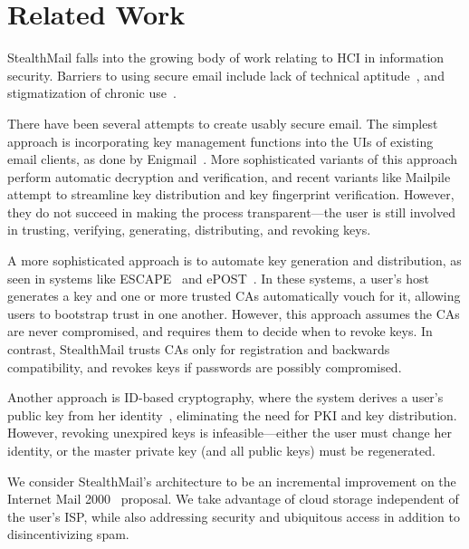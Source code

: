 \section{Related Work}
\label{sec:related-work}

StealthMail falls into the growing body of work relating to HCI in information security.  Barriers
to using secure email include lack of technical aptitude~\cite{garfinkel-email-survey, why-jonny-cant-encrypt}, and
stigmatization of chronic use~\cite{crypto-adoption-criteria}.

There have been several attempts to create usably secure email.
The simplest approach is incorporating key management functions into the 
UIs of existing email clients, as done by Enigmail~\cite{enigmail}.
More sophisticated variants of this approach perform automatic decryption
and verification, and recent variants like Mailpile~\cite{mailpile} attempt
to streamline key distribution and key fingerprint verification.  However, they do not
succeed in making the process transparent---the user is still involved in
trusting, verifying, generating, distributing, and revoking keys.

A more sophisticated approach is to automate key generation and distribution,
as seen in systems like ESCAPE~\cite{escape} and ePOST~\cite{epost}.
In these systems, a user's host generates a key and one or more trusted CAs
automatically vouch for it, allowing users to bootstrap trust in one another.
However, this approach assumes the CAs are never compromised, and requires them
to decide when to revoke keys.
In contrast, StealthMail trusts CAs only for registration and backwards
compatibility, and revokes keys if passwords are possibly compromised.

Another approach is ID-based cryptography, where the system 
derives a user's public key from her identity~\cite{id-based-cryptography}, eliminating the need for PKI and key distribution.  However,
revoking unexpired keys is infeasible---either the user must change 
her identity, or the master private key (and all public keys) must be 
regenerated.

We consider StealthMail's architecture to be an incremental improvement on
the Internet Mail 2000~\cite{im2k} proposal.  We take advantage of cloud storage 
independent of the user's ISP, while also addressing security and ubiquitous
access in addition to disincentivizing spam.
